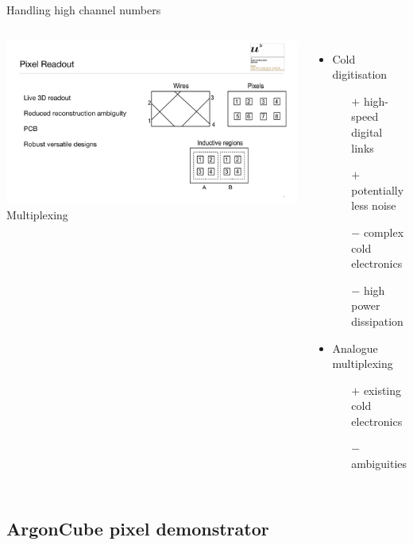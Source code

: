 \documentclass[]{beamer}
\newcommand*{\emphcol}{red}
\newcommand*{\AC}{{ArgonCube}}
\begin{document}
\begin{frame}{Handling high channel numbers}
	\begin{columns}[c]
		\centering
		\includegraphics[page=1, viewport=930 90 1850 800, clip, width=\textwidth]{defence/Pixels}\\
		Multiplexing
		\begin{itemize}
			\item Cold digitisation
			\begin{itemize}
				\item[$+$] high-speed digital links
				\item[$+$] potentially less noise
				\item[$-$] complex cold electronics
				\item[$-$] high power dissipation
			\end{itemize}
			\item {\color{\emphcol} Analogue multiplexing}
			\begin{itemize}
				\item[$+$] existing cold electronics
				\item[$-$] ambiguities
			\end{itemize}
		\end{itemize}
	\end{columns}
\end{frame}

\subsection{\AC{} pixel demonstrator}
\end{document}
